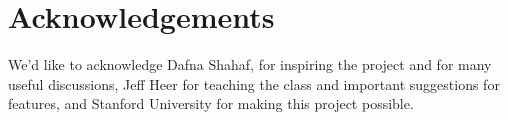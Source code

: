 \documentclass{chi2009}
\begin{document}
\section{Acknowledgements}

We'd like to acknowledge Dafna Shahaf, for inspiring the project and for many useful discussions, Jeff Heer for teaching the class and important suggestions for features, and Stanford University for making this project possible.



\end{document}
